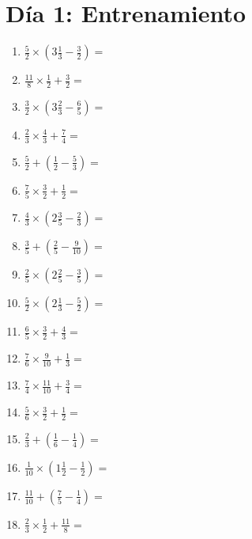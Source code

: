 \documentclass[12pt]{article}
\begin{document}
\section*{Día 1: Entrenamiento}
\begin{enumerate}[itemsep=1.5cm]
	\item $\displaystyle \frac{5}{2} \times \left( 3 \frac{1}{3} - \frac{3}{2} \right) =$
	\item $\displaystyle \frac{11}{8} \times \frac{1}{2} + \frac{3}{2} =$
	\item $\displaystyle \frac{3}{2} \times \left( 3 \frac{2}{3} - \frac{6}{5} \right) =$
	\item $\displaystyle \frac{2}{3} \times \frac{4}{3} + \frac{7}{4} =$
	\item $\displaystyle \frac{5}{2} + \left( \frac{1}{2} - \frac{5}{3} \right) =$
	\item $\displaystyle \frac{7}{5} \times \frac{3}{2} + \frac{1}{2} =$
	\item $\displaystyle \frac{4}{3} \times \left( 2 \frac{3}{5} - \frac{2}{3} \right) =$
	\item $\displaystyle \frac{3}{5} + \left( \frac{2}{5} - \frac{9}{10} \right) =$
	\item $\displaystyle \frac{2}{5} \times \left( 2 \frac{2}{5} - \frac{3}{5} \right) =$

	\item $\displaystyle \frac{5}{2} \times \left( 2 \frac{1}{3} - \frac{5}{2} \right) =$
	\item $\displaystyle \frac{6}{5} \times \frac{3}{2} + \frac{4}{3} =$
	\item $\displaystyle \frac{7}{6} \times \frac{9}{10} + \frac{1}{3} =$
	\item $\displaystyle \frac{7}{4} \times \frac{11}{10} + \frac{3}{4} =$
	\item $\displaystyle \frac{5}{6} \times \frac{3}{2} + \frac{1}{2} =$
	\item $\displaystyle \frac{2}{3} + \left( \frac{1}{6} - \frac{1}{4} \right) =$
	\item $\displaystyle \frac{1}{10} \times \left( 1 \frac{1}{2} - \frac{1}{2} \right) =$
	\item $\displaystyle \frac{11}{10} + \left( \frac{7}{5} - \frac{1}{4} \right) =$
	\item $\displaystyle \frac{2}{3} \times \frac{1}{2} + \frac{11}{8} =$


\end{enumerate}
\end{document}

